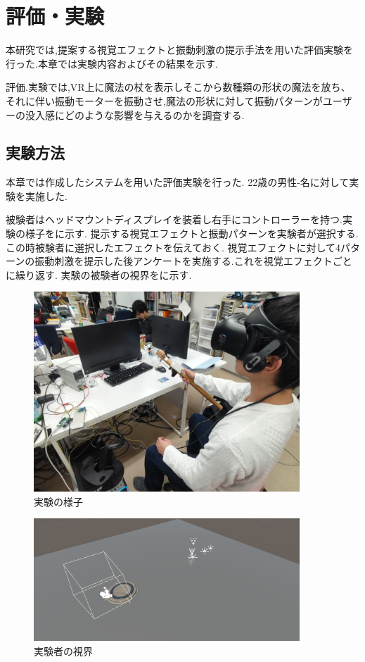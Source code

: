 \chapter{評価・実験}
本研究では,提案する視覚エフェクトと振動刺激の提示手法を用いた評価実験を行った.本章では実験内容およびその結果を示す.

評価.実験では,VR上に魔法の杖を表示しそこから数種類の形状の魔法を放ち、それに伴い振動モーターを振動させ,魔法の形状に対して振動パターンがユーザーの没入感にどのような影響を与えるのかを調査する.

\section{実験方法}
本章では作成したシステムを用いた評価実験を行った.
22歳の男性-名に対して実験を実施した.

被験者はヘッドマウントディスプレイを装着し右手にコントローラーを持つ.実験の様子をに示す.
提示する視覚エフェクトと振動パターンを実験者が選択する.この時被験者に選択したエフェクトを伝えておく.
視覚エフェクトに対して4パターンの振動刺激を提示した後アンケートを実施する.これを視覚エフェクトごとに繰り返す.
実験の被験者の視界をに示す.

\begin{figure}[h]
\centering
\includegraphics[clip,width=10cm]{./fig/jikken.JPG}
\caption{実験の様子}\label{jikken}
\end{figure}


\begin{figure}[h]
\centering
\includegraphics[clip,width=10cm]{./fig/unity_first.png}
\caption{実験者の視界}\label{first}
\end{figure}




